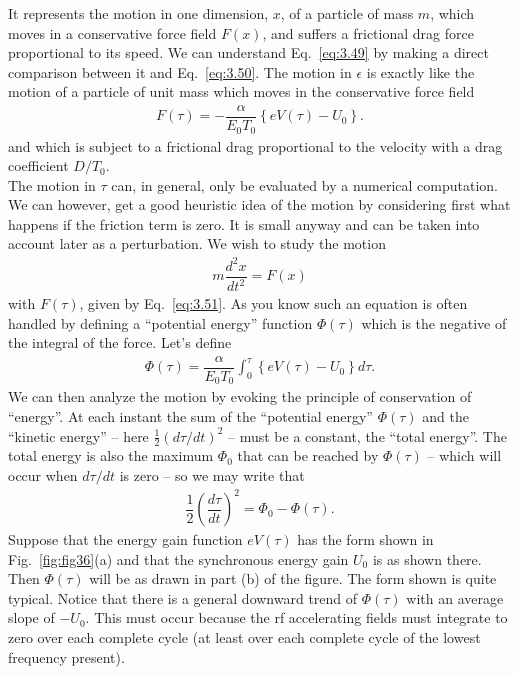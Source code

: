 It represents the motion in one dimension, $x$, of a particle of mass $m$, which
moves in a conservative force field $F(x)$, and suffers a frictional drag force proportional
 to its speed. We can understand Eq.~\eqref{eq:3.49} by making a direct comparison between it and Eq.~\eqref{eq:3.50}. The motion in $\epsilon$ is exactly like the motion of a particle of unit mass which moves in the conservative force field
\begin{align}\label{eq:3.51}
	F(\tau) = - \dfrac{\alpha}{E_0 T_0} \left\lbrace eV(\tau) - U_0 \right\rbrace.
\end{align}
and which is subject to a frictional drag proportional to the velocity with a drag coefficient
 $D/T_0$.\\
 The motion in $\tau$ can, in general, only be evaluated by a numerical computation. We can however, get a good heuristic idea of the motion by considering first what happens if the friction term is zero. It is small anyway and can be taken into account later as a perturbation.
 We wish to study the motion
\begin{align}
	m\dfrac{d^2x}{dt^2} = F(x)
\end{align}
with $F(\tau)$, given by Eq.~\eqref{eq:3.51}. As you know such an equation is often handled by
defining a ``potential energy'' function $\Phi(\tau)$ which is the negative of the integral
 of the force. Let's define
\begin{align} \label{eq:3.53}
	\Phi(\tau) = \dfrac{\alpha}{E_0 T_0} \int_0^\tau \left\lbrace eV(\tau) - U_0 \right\rbrace d\tau.
\end{align}
We can then analyze the motion by evoking the principle of conservation of ``energy''. At each instant the sum of the ``potential energy'' $\Phi(\tau)$ and the ``kinetic energy'' -- here $\frac{1}{2} (d\tau/dt)^2$ -- must be a constant, the ``total energy''. The total energy is
also the maximum $\Phi_0$ that can be reached by $\Phi(\tau)$ -- which will occur when $d\tau/dt$
is zero -- so we may write that
\begin{align}\label{eq:3.54}
	\dfrac{1}{2}\left(\dfrac{d\tau}{dt}\right)^2 = \Phi_0 - \Phi(\tau).
\end{align}
Suppose that the energy gain function $eV(\tau)$ has the form shown in Fig.~\ref{fig:fig36}(a) and that the synchronous energy gain $U_0$ is as shown there. Then $\Phi(\tau)$ will be as drawn in part (b) of the figure. The form shown is quite typical.  Notice that there is a general downward trend of $\Phi(\tau)$ with an average slope of $-U_0$. This must occur because the rf accelerating fields must integrate to zero over each complete cycle (at least over each complete cycle of the lowest frequency present).\\

